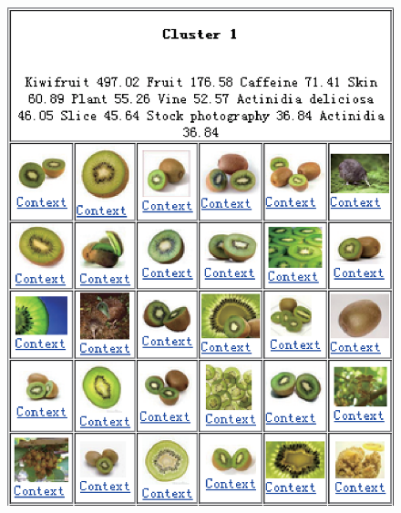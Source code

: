 \begin{figure}[th]
\begin{minipage}[t]{0.5\linewidth}
\centering
\includegraphics[width=0.98\columnwidth]{kiwi_fruit.eps}
\end{minipage}%
\begin{minipage}[t]{0.5\linewidth}
\centering

\end{minipage}
\end{figure}
